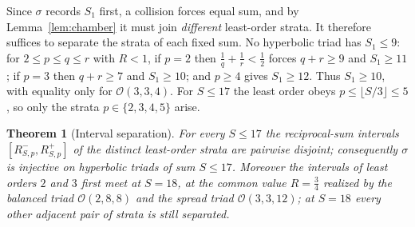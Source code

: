 \documentclass[12pt, letterpaper]{article}
\theoremstyle{definition}
\theoremstyle{plain}
\newtheorem{theorem}{Theorem}[section]
\begin{document}
Since $\sigma$ records $S_1$ first, a collision forces equal sum, and by Lemma~\ref{lem:chamber} it must join \emph{different} least-order strata. It therefore suffices to separate the strata of each fixed sum. No hyperbolic triad has $S_1\le9$: for $2\le p\le q\le r$ with $R<1$, if $p=2$ then $\tfrac1q+\tfrac1r<\tfrac12$ forces $q+r\ge9$ and $S_1\ge11$; if $p=3$ then $q+r\ge7$ and $S_1\ge10$; and $p\ge4$ gives $S_1\ge12$. Thus $S_1\ge10$, with equality only for $\mathcal{O}(3,3,4)$. For $S\le17$ the least order obeys $p\le\lfloor S/3\rfloor\le5$, so only the strata $p\in\{2,3,4,5\}$ arise.

\begin{theorem}[Interval separation]\label{thm:separation}
For every $S\le17$ the reciprocal-sum intervals $[R^{-}_{S,p},R^{+}_{S,p}]$ of the distinct least-order strata are pairwise disjoint; consequently $\sigma$ is injective on hyperbolic triads of sum $S\le17$. Moreover the intervals of least orders $2$ and $3$ first meet at $S=18$, at the common value $R=\tfrac34$ realized by the balanced triad $\mathcal{O}(2,8,8)$ and the spread triad $\mathcal{O}(3,3,12)$; at $S=18$ every other adjacent pair of strata is still separated.
\end{theorem}
\end{document}
